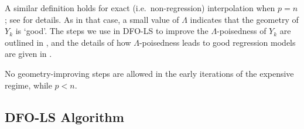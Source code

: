 A similar definition holds for exact (i.e.~non-regression) interpolation when $p=n$; see \cite{Cartis2017a} for details.
As in that case, a small value of $\Lambda$ indicates that the geometry of $Y_k$ is `good'.
The steps we use in DFO-LS to improve the $\Lambda$-poisedness of $Y_k$ are outlined in , and the details of how $\Lambda$-poisedness leads to good regression models are given in .

No geometry-improving steps are allowed in the early iterations of the expensive regime, while $p<n$.

\subsection{DFO-LS Algorithm}
